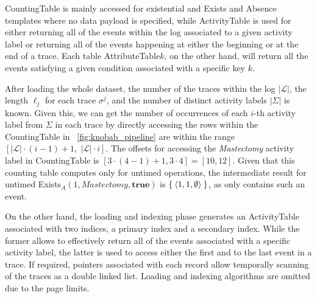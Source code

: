 \textsf{CountingTable} is mainly accessed for existential and \textsf{Exists} and \textsf{Absence} templates where no data payload is specified, while  \textsf{ActivityTable} is  used for either returning all of the events within the log associated to a given activity label or returning all of the events happening at either the beginning or at the end of a trace. Each table \textsf{AttributeTable$k$}, on the other hand, will 
return all the events satisfying a given condition associated with a specific %
key $k$. 

After loading the whole dataset, the number of the traces within the log $|\mathcal{L}|$, the length $\ell_j$ for each trace $\sigma^j$, and the number of distinct activity labels $|\Sigma|$ is known. Given this, we can get the number of occurrences of each $i$-th activity label from $\Sigma$ in each trace by directly accessing the rows within the \textsf{CountingTable} in \figurename~\ref{fig:knobab_pipeline} are within the range $[|\mathcal{L}|\cdot (i-1) + 1,\; |\mathcal{L}|\cdot i]$. The offsets for accessing the \textit{Mastectomy} activity label in \textsf{CountingTable} is $[3 \cdot (4-1) + 1, 3 \cdot 4] = [10,12]$. Given that this counting table computes only for untimed operations, the intermediate result for untimed \textsf{Exists}$_A(1,\textit{Mastectomy},\textbf{true})$ is $\Set{\braket{1,1,\emptyset}}$, as only  contains such an event.

On the other hand, the loading and indexing phase generates an \textsf{ActivityTable} associated with two indices, a primary index and a secondary index. While the former allows to effectively return all of the events associated with a specific activity label, the latter is used to access either the first and to the last event in a trace. If required, pointers associated with each record allow temporally scanning of the traces as a double linked list. 
Loading and indexing algorithms are omitted due to the page limits.



